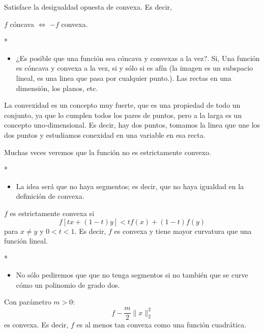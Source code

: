 \begin{paracol}{2}
\begin{def.} Satisface la desigualdad opuesta de convexa. Es decir,
    \begin{center}
	$f$ cóncava $\Leftrightarrow$ $-f$ convexa.
    \end{center}
\end{def.}

\switchcolumn[1]*{\noindent\scriptsize
	\begin{itemize}
	    \item ¿Es posible que una función sea cóncava y convexas a la vez?. Si, Una función es cóncava y convexa a la vez, si y sólo si es afín (la imagen es un subspacio lineal, es una linea que pasa por cualquier punto.). Las rectas en una dimensión, los planos, etc. 
	\end{itemize}
}
\switchcolumn[0]\noindent
\begin{tcolorbox}[colframe=white]
    La convexidad es un concepto muy fuerte, que es una propiedad de todo un conjunto, ya que lo cumplen todos los pares de puntos, pero a la larga es un concepto uno-dimensional. Es decir, hay dos puntos, tomamos la linea que une los dos puntos y estudiamos conexidad en una variable en esa recta. 
\end{tcolorbox}
\vspace{.5cm}
Muchas veces veremos que la función no es estrictamente convexo.

\switchcolumn[1]*{\noindent\scriptsize
	\begin{itemize}
	    \item La idea será que no haya segmentos; es decir, que no haya igualdad en la definición de convexa.
	\end{itemize}
}
\switchcolumn[0]\noindent
\begin{def.} $f$ es estrictamente convexa si
	$$f\left[tx+(1-t)y\right]< tf(x)+(1-t)f(y)$$
	para $x\neq y$ y $0<t<1$. Es decir, $f$ es convexa y tiene mayor curvatura que una función lineal.
\end{def.}

\switchcolumn[1]*{\noindent\scriptsize
	\begin{itemize}
	    \item No sólo pediremos que que no tenga segmentos si no también que se curve cómo un polinomio de grado dos.
	\end{itemize}
}
\switchcolumn[0]\noindent
\begin{def.} Con parámetro $m>0$:
    $$f-\dfrac{m}{2}\|x\|^2_2$$
    es convexa. Es decir, $f$ es al menos tan convexa como una función cuadrática.
\end{def.}


\end{paracol}
